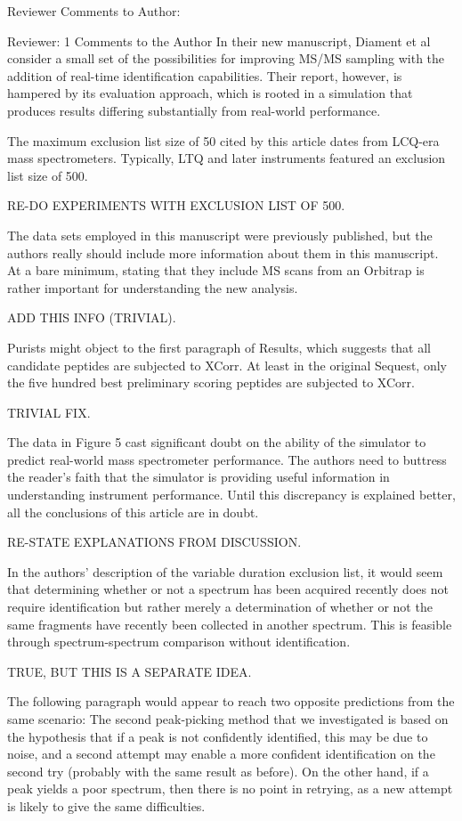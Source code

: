 Reviewer Comments to Author:

Reviewer: 1
Comments to the Author
In their new manuscript, Diament et al consider a small set of the
possibilities for improving MS/MS sampling with the addition of
real-time identification capabilities.  Their report, however, is
hampered by its evaluation approach, which is rooted in a simulation
that produces results differing substantially from real-world
performance.

The maximum exclusion list size of 50 cited by this article dates from
LCQ-era mass spectrometers.  Typically, LTQ and later instruments
featured an exclusion list size of 500.

RE-DO EXPERIMENTS WITH EXCLUSION LIST OF 500.

The data sets employed in this manuscript were previously published,
but the authors really should include more information about them in
this manuscript.  At a bare minimum, stating that they include MS
scans from an Orbitrap is rather important for understanding the new
analysis.

ADD THIS INFO (TRIVIAL).

Purists might object to the first paragraph of Results, which suggests
that all candidate peptides are subjected to XCorr.  At least in the
original Sequest, only the five hundred best preliminary scoring
peptides are subjected to XCorr.

TRIVIAL FIX.

The data in Figure 5 cast significant doubt on the ability of the
simulator to predict real-world mass spectrometer performance.  The
authors need to buttress the reader's faith that the simulator is
providing useful information in understanding instrument performance.
Until this discrepancy is explained better, all the conclusions of
this article are in doubt.

RE-STATE EXPLANATIONS FROM DISCUSSION.

In the authors' description of the variable duration exclusion list,
it would seem that determining whether or not a spectrum has been
acquired recently does not require identification but rather merely a
determination of whether or not the same fragments have recently been
collected in another spectrum.  This is feasible through
spectrum-spectrum comparison without identification.

TRUE, BUT THIS IS A SEPARATE IDEA.

The following paragraph would appear to reach two opposite predictions
from the same scenario: The second peak-picking method that we
investigated is based on the hypothesis that if a peak is not
confidently identified, this may be due to noise, and a second attempt
may enable a more confident identification on the second try (probably
with the same result as before).  On the other hand, if a peak yields
a poor spectrum, then there is no point in retrying, as a new attempt
is likely to give the same difficulties.

